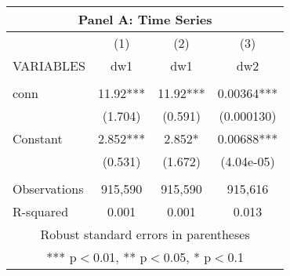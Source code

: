\documentclass[]{article}
\begin{document}
\begin{tabular}{lccc}
\multicolumn{4}{c}{Panel A: Time Series} \\ \hline
 & (1) & (2) & (3) \\
VARIABLES & dw1 & dw1 & dw2 \\ \hline
 &  &  &  \\
conn & 11.92*** & 11.92*** & 0.00364*** \\
 & (1.704) & (0.591) & (0.000130) \\
Constant & 2.852*** & 2.852* & 0.00688*** \\
 & (0.531) & (1.672) & (4.04e-05) \\
 &  &  &  \\
Observations & 915,590 & 915,590 & 915,616 \\
 R-squared & 0.001 & 0.001 & 0.013 \\ \hline
\multicolumn{4}{c}{ Robust standard errors in parentheses} \\
\multicolumn{4}{c}{ *** p$<$0.01, ** p$<$0.05, * p$<$0.1} \\
\end{tabular}
\end{document}

